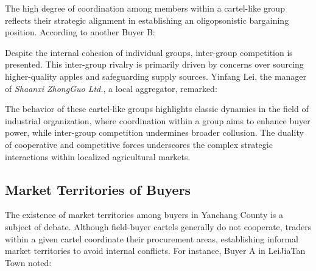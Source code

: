 The high degree of coordination among members within a cartel-like group reflects their strategic alignment in establishing an oligopsonistic bargaining position. According to another Buyer B:

\begin{quote}
\end{quote}

Despite the internal cohesion of individual groups, inter-group competition is presented. This inter-group rivalry is primarily driven by concerns over sourcing higher-quality apples and safeguarding supply sources. Yinfang Lei, the manager of \textit{Shaanxi ZhongGuo Ltd.}, a local aggregator, remarked:

\begin{quote}
\end{quote}

The behavior of these cartel-like groups highlights classic dynamics in the field of industrial organization, where coordination within a group aims to enhance buyer power, while inter-group competition undermines broader collusion. The duality of cooperative and competitive forces underscores the complex strategic interactions within localized agricultural markets.



\subsection{Market Territories of Buyers}
\noindent The existence of market territories among buyers in Yanchang County is a subject of debate. Although field-buyer cartels generally do not cooperate, traders within a given cartel coordinate their procurement areas, establishing informal market territories to avoid internal conflicts. For instance, Buyer A in LeiJiaTan Town noted: 

\begin{quote}
\end{quote}

